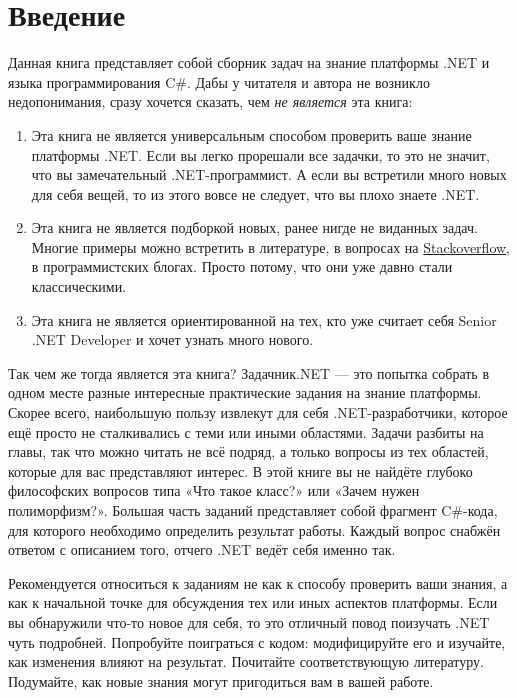 \chapter*{Введение}
Данная книга представляет собой сборник задач на знание платформы .NET и языка программирования C\#. Дабы у читателя и автора не возникло недопонимания, сразу хочется сказать, чем \textit{не является} эта книга:
\begin{enumerate}
  \item Эта книга не является универсальным способом проверить ваше знание платформы .NET. Если вы легко прорешали все задачки, то это не значит, что вы замечательный .NET-программист. А если вы встретили много новых для себя вещей, то из этого вовсе не следует, что вы плохо знаете .NET.
  \item Эта книга не является подборкой новых, ранее нигде не виданных задач. Многие примеры можно встретить в литературе, в вопросах на \href{http://stackoverflow.com/}{Stackoverflow}, в программистских блогах. Просто потому, что они уже давно стали классическими.
  \item Эта книга не является ориентированной на тех, кто уже считает себя Senior .NET Developer и хочет узнать много нового.
\end{enumerate}

Так чем же тогда является эта книга? Задачник.NET — это попытка собрать в одном месте разные интересные практические задания на знание платформы. Скорее всего, наибольшую пользу извлекут для себя .NET-разработчики, которое ещё просто не сталкивались с теми или иными областями. Задачи разбиты на главы, так что можно читать не всё подряд, а только вопросы из тех областей, которые для вас представляют интерес. В этой книге вы не найдёте глубоко философских вопросов типа «Что такое класс?» или «Зачем нужен полиморфизм?». Большая часть заданий представляет собой фрагмент C\#-кода, для которого необходимо определить результат работы. Каждый вопрос снабжён ответом с описанием того, отчего .NET ведёт себя именно так.

Рекомендуется относиться к заданиям не как к способу проверить ваши знания, а как к начальной точке для обсуждения тех или иных аспектов платформы. Если вы обнаружили что-то новое для себя, то это отличный повод поизучать .NET чуть подробней. Попробуйте поиграться с кодом: модифицируйте его и изучайте, как изменения влияют на результат. Почитайте соответствующую литературу. Подумайте, как новые знания могут пригодиться вам в вашей работе.

